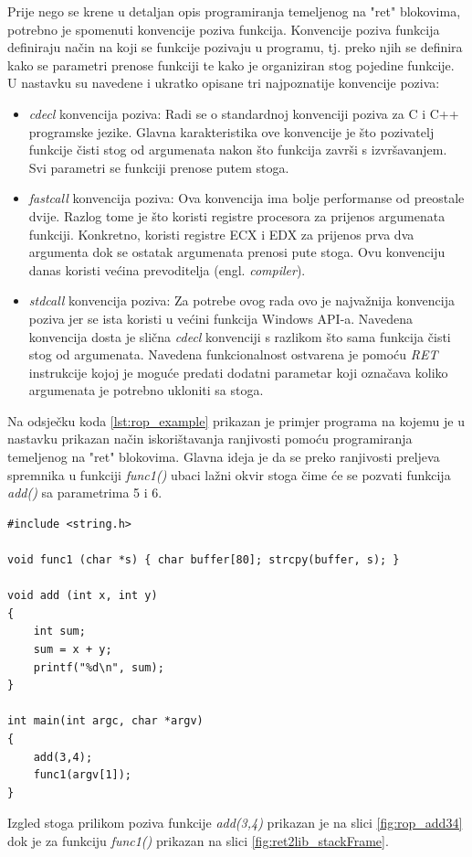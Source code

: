 \documentclass[times, utf8, diplomski, numeric]{fer}
\begin{document}
Prije nego se krene u detaljan opis programiranja temeljenog na
"ret" blokovima, potrebno  je spomenuti konvencije poziva
funkcija. Konvencije poziva funkcija definiraju način na koji se
funkcije pozivaju u programu, tj. preko njih se definira kako se
parametri prenose funkciji te kako je organiziran stog pojedine
funkcije. U nastavku su navedene i ukratko opisane tri
najpoznatije konvencije poziva:

\begin{itemize}

\item \emph{cdecl} konvencija poziva: Radi se o standardnoj
konvenciji poziva za C i C++ programske jezike. Glavna
karakteristika ove konvencije je što pozivatelj funkcije čisti
stog od argumenata nakon što funkcija završi s izvršavanjem. Svi
parametri se funkciji prenose putem stoga.

\item \emph{fastcall} konvencija poziva: Ova konvencija ima bolje
performanse od preostale dvije. Razlog tome je što koristi
registre procesora za prijenos argumenata funkciji. Konkretno,
koristi registre ECX i EDX za prijenos prva dva argumenta dok se
ostatak argumenata prenosi pute stoga. Ovu konvenciju danas
koristi većina prevoditelja (engl. \emph{compiler}).

\item \emph{stdcall} konvencija poziva: Za potrebe ovog rada ovo
je najvažnija konvencija poziva jer se ista koristi u većini
funkcija Windows API-a. Navedena konvencija dosta je slična
\emph{cdecl} konvenciji s razlikom što sama funkcija čisti stog
od argumenata. Navedena funkcionalnost ostvarena je pomoću
\emph{RET} instrukcije kojoj je moguće predati dodatni parametar
koji označava koliko argumenata je potrebno ukloniti sa stoga.
\end{itemize}

Na odsječku koda \ref{lst:rop_example} prikazan je primjer
programa na kojemu je u nastavku prikazan način iskorištavanja
ranjivosti pomoću programiranja temeljenog na "ret" blokovima.
Glavna ideja je da se preko ranjivosti preljeva spremnika u
funkciji \emph{func1()} ubaci lažni okvir stoga čime će se
pozvati funkcija \emph{add()} sa parametrima 5 i 6.
 
\begin{lstlisting}[frame=single, caption=Primjera programa za
programiranje "ret" blokovima, label={lst:rop_example}]
#include <string.h>
 
void func1 (char *s) { char buffer[80]; strcpy(buffer, s); }

void add (int x, int y)
{
	int sum;
	sum = x + y;
	printf("%d\n", sum);
}

int main(int argc, char *argv)
{
	add(3,4);
	func1(argv[1]);
}
\end{lstlisting}
Izgled stoga prilikom poziva funkcije \emph{add(3,4)} prikazan je na slici \ref{fig:rop_add34} dok je za funkciju \emph{func1()} prikazan na slici \ref{fig:ret2lib_stackFrame}.
\end{document}

